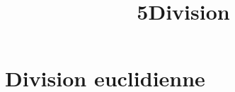 \documentclass[12pt,a4paper]{article}
\date{}
\title{\textcircled{{\normalsize{5}}}Division}
\begin{document}
\maketitle








\section{Division euclidienne}







%






%
\end{document}
